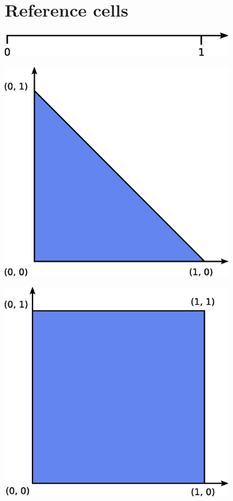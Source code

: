 \chapter{Reference cells}

\includegraphics[width=10cm]{eps/interval.eps}

\includegraphics[width=10cm]{eps/triangle.eps}

\includegraphics[width=10cm]{eps/quadrilateral.eps}

